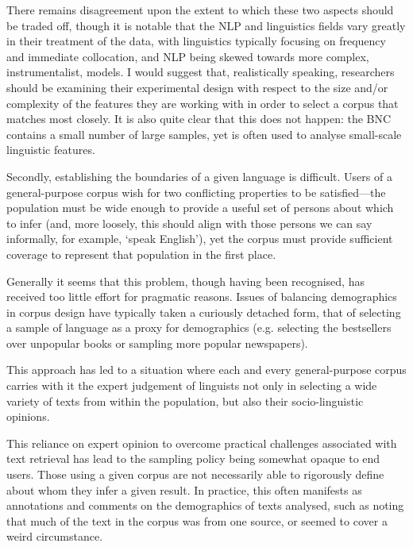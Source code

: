 There remains disagreement upon the extent to which these two aspects should be traded off, though it is notable that the NLP and linguistics fields vary greatly in their treatment of the data, with linguistics typically focusing on frequency and immediate collocation, and NLP being skewed towards more complex, instrumentalist, models.  I would suggest that, realistically speaking, researchers should be examining their experimental design with respect to the size and/or complexity of the features they are working with in order to select a corpus that matches most closely.  It is also quite clear that this does not happen: the BNC contains a small number of large samples, yet is often used to analyse small-scale linguistic features.



Secondly, establishing the boundaries of a given language is difficult.  Users of a general-purpose corpus wish for two conflicting properties to be satisfied---the population must be wide enough to provide a useful set of persons about which to infer (and, more loosely, this should align with those persons we can say informally, for example, `speak English'), yet the corpus must provide sufficient coverage to represent that population in the first place.

Generally it seems that this problem, though having been recognised, has received too little effort for pragmatic reasons.  Issues of balancing demographics in corpus design have typically taken a curiously detached form, that of selecting a sample of language as a proxy for demographics (e.g. selecting the bestsellers over unpopular books or sampling more popular newspapers).


This approach has led to a situation where each and every general-purpose corpus carries with it the expert judgement of linguists not only in selecting a wide variety of texts from within the population, but also their socio-linguistic opinions.

This reliance on expert opinion to overcome practical challenges associated with text retrieval has lead to the sampling policy being somewhat opaque to end users.
Those using a given corpus are not necessarily able to rigorously define about whom they infer a given result.  In practice, this often manifests as annotations and comments on the demographics of texts analysed, such as noting that much of the text in the corpus was from one source, or seemed to cover a weird circumstance.


